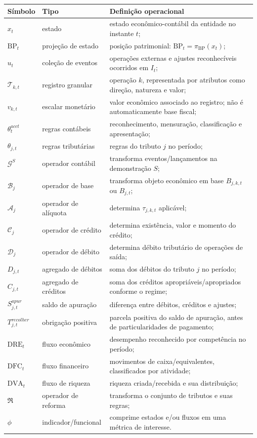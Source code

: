 \documentclass[11pt,a4paper]{article}
\newcommand{\BP}{\mathrm{BP}}
\newcommand{\DRE}{\mathrm{DRE}}
\newcommand{\DFC}{\mathrm{DFC}}
\newcommand{\DVA}{\mathrm{DVA}}
\newcommand{\cT}{\mathcal{T}}
\newcommand{\cB}{\mathcal{B}}
\newcommand{\cG}{\mathcal{G}}
\newcommand{\cA}{\mathcal{A}}
\newcommand{\cC}{\mathcal{C}}
\newcommand{\cD}{\mathcal{D}}
\begin{document}
\begin{longtable}{p{} p{} p{}}
\toprule
\textbf{Símbolo} & \textbf{Tipo} & \textbf{Definição operacional}\\
\midrule
$x_t$ & estado & estado econômico-contábil da entidade no instante $t$;\\
$\BP_t$ & projeção de estado & posição patrimonial: $\BP_t=\pi_{\BP}(x_t)$;\\
$u_t$ & coleção de eventos & operações externas e ajustes reconhecíveis ocorridos em $I_t$;\\
$\cT_{k,t}$ & registro granular & operação $k$, representada por atributos como direção, natureza e valor;\\
$v_{k,t}$ & escalar monetário & valor econômico associado ao registro; não é automaticamente base fiscal;\\
$\theta_t^{acct}$ & regras contábeis & reconhecimento, mensuração, classificação e apresentação;\\
$\theta_{j,t}$ & regras tributárias & regras do tributo $j$ no período;\\
$\cG^S$ & operador contábil & transforma eventos/lançamentos na demonstração $S$;\\
$\cB_j$ & operador de base & transforma objeto econômico em base $B_{j,k,t}$ ou $B_{j,t}$;\\
$\cA_j$ & operador de alíquota & determina $\tau_{j,k,t}$ aplicável;\\
$\cC_j$ & operador de crédito & determina existência, valor e momento do crédito;\\
$\cD_j$ & operador de débito & determina débito tributário de operações de saída;\\
$D_{j,t}$ & agregado de débitos & soma dos débitos do tributo $j$ no período;\\
$C_{j,t}$ & agregado de créditos & soma dos créditos apropriáveis/apropriados conforme o regime;\\
$S_{j,t}^{apur}$ & saldo de apuração & diferença entre débitos, créditos e ajustes;\\
$T_{j,t}^{recolher}$ & obrigação positiva & parcela positiva do saldo de apuração, antes de particularidades de pagamento;\\
$\DRE_t$ & fluxo econômico & desempenho reconhecido por competência no período;\\
$\DFC_t$ & fluxo financeiro & movimentos de caixa/equivalentes, classificados por atividade;\\
$\DVA_t$ & fluxo de riqueza & riqueza criada/recebida e sua distribuição;\\
$\mathfrak R$ & operador de reforma & transforma o conjunto de tributos e suas regras;\\
$\phi$ & indicador/funcional & comprime estados e/ou fluxos em uma métrica de interesse.\\
\bottomrule
\end{longtable}
\end{document}
